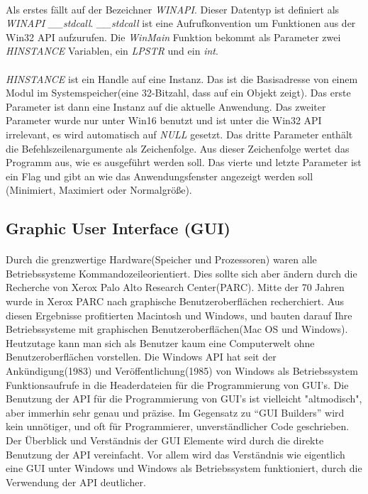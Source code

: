 \paragraph{}
Als erstes fällt auf der Bezeichner \textit{WINAPI}. Dieser Datentyp ist definiert als \textit{WINAPI \_\_stdcall}. \textit{\_\_stdcall} ist eine Aufrufkonvention um Funktionen aus der Win32 API aufzurufen. Die \textit{WinMain} Funktion bekommt als Parameter zwei \textit{HINSTANCE} Variablen, ein \textit{LPSTR} und ein \textit{int}.

\paragraph{}
\textit{HINSTANCE} ist ein Handle auf eine Instanz. Das ist die Basisadresse von einem Modul im Systemspeicher(eine 32-Bitzahl, dass auf ein Objekt zeigt). Das erste Parameter ist dann eine Instanz auf die aktuelle Anwendung. Das zweiter Parameter wurde nur unter Win16 benutzt und ist unter die Win32 API irrelevant, es wird automatisch auf \textit{NULL} gesetzt. Das dritte Parameter enthält die Befehlszeilenargumente als Zeichenfolge. Aus dieser Zeichenfolge wertet das Programm aus, wie es ausgeführt werden soll. Das vierte und letzte Parameter ist ein Flag und gibt an wie das Anwendungsfenster angezeigt werden soll (Minimiert, Maximiert oder Normalgröße).

\subsection{Graphic User Interface (GUI)}
\paragraph{}
Durch die grenzwertige Hardware(Speicher und Prozessoren) waren alle Betriebssysteme Kommandozeileorientiert. Dies sollte sich aber ändern durch die Recherche von Xerox Palo Alto Research Center(PARC). Mitte der 70 Jahren wurde in Xerox PARC nach graphische Benutzeroberflächen recherchiert. Aus diesen Ergebnisse profitierten Macintosh und Windows, und bauten darauf Ihre Betriebssysteme mit graphischen Benutzeroberflächen(Mac OS und Windows). Heutzutage kann man sich als Benutzer kaum eine Computerwelt ohne Benutzeroberflächen vorstellen. Die Windows API hat seit der Ankündigung(1983) und Veröffentlichung(1985) von Windows als Betriebssystem Funktionsaufrufe in die Headerdateien für die Programmierung von GUI's. Die Benutzung der API für die Programmierung von GUI's ist vielleicht "altmodisch", aber immerhin sehr genau und präzise. Im Gegensatz zu "`GUI Builders"' wird kein unnötiger, und oft für Programmierer, unverständlicher Code geschrieben. Der Überblick und Verständnis der GUI Elemente wird durch die direkte Benutzung der API vereinfacht. Vor allem wird das Verständnis wie eigentlich eine GUI unter Windows und Windows als Betriebssystem funktioniert, durch die Verwendung der API deutlicher.

